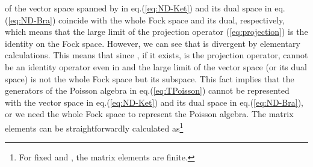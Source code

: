 \documentclass[a4paper,12pt]{article}
\providecommand{\bra}[1]{\langle\,#1\,|}
\providecommand{\ket}[1]{|\,#1\,\rangle}
\providecommand{\Nket}[1]{|\,#1\,)_N}
\begin{document}
of the vector space spanned by \myHighlight{$\Nket{k;\eta}$}\coordHE{} in eq.(\ref{eq:ND-Ket})
and its dual space in eq.(\ref{eq:ND-Bra}) coincide with the whole
Fock space and its dual, respectively, which means that the large \coordHE{}
limit of the projection operator \coordHE{} (\ref{eq:projection}) is
the identity on the Fock space. However, we can see that
\myHighlight{$\mathop{\lim}\limits_{N\rightarrow\infty}\bra{0}\,[a,P^\eta_N]\,
\ket{1}$}\coordHE{} is divergent by elementary calculations. This means that
since \coordHE{}, if it
exists, is the projection operator, \coordHE{} cannot be an identity
operator even in \coordHE{} and the large \coordHE{} limit of the
vector space (or its dual space) is not the whole Fock space but its
subspace. This fact implies that the generators of the Poisson algebra
in eq.(\ref{eq:TPoisson}) cannot be represented with the vector space
in eq.(\ref{eq:ND-Ket}) and its dual space in eq.(\ref{eq:ND-Bra}),
or we need the whole Fock space to represent the Poisson algebra.
The matrix elements \myHighlight{$\bra{k} T^{(P,\xi)}_{\bf m} \ket{l}\quad
(k,l=0,1,\cdots)$}\coordHE{} can be straightforwardly calculated as\footnote{
For fixed \coordHE{} and \coordHE{}, the matrix elements are finite.}
\end{document}
